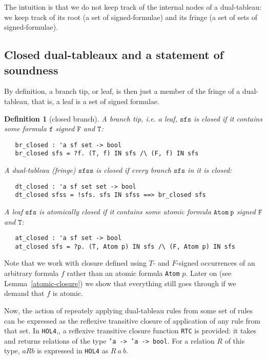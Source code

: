 \documentclass[a4paper]{article}
\newtheorem{definition}{Definition}
\newcommand{\hol}{\texttt{HOL4}}
\newcommand{\ie}{\textit{i.e. }}
\begin{document}
The intuition is that we do not keep track of the internal nodes of a
dual-tableau: we keep track of its root (a set of signed-formulae) and
its fringe (a set of sets of signed-formulae).

\subsection{Closed dual-tableaux and a statement of soundness}

By definition, a branch tip, or leaf, is then just a member of the fringe of a
dual-tableau, that is, a leaf is a set of signed formulae. 

\begin{definition}[closed branch]
\label{br-closed}\label{dt-closed}\label{at-closed}
  A branch tip, \ie a leaf, $\mathtt{sfs}$ is closed if it contains some
  formula $\mathtt{f}$ signed
  $\mathtt{F}$ and $\mathtt{T}$:
\begin{verbatim}
   br_closed : 'a sf set -> bool
   br_closed sfs = ?f. (T, f) IN sfs /\ (F, f) IN sfs 
\end{verbatim}

  A dual-tableau (fringe) $\mathtt{sfss}$ is closed if every 
  branch $\mathtt{sfs}$ in it is closed: 
\begin{verbatim}
   dt_closed : 'a sf set set -> bool
   dt_closed sfss = !sfs. sfs IN sfss ==> br_closed sfs 
\end{verbatim}

  A leaf $\mathtt{sfs}$ is atomically closed if it contains some atomic
  formula $\mathtt{Atom\ p}$ signed
  $\mathtt{F}$ and $\mathtt{T}$:
\begin{verbatim}
   at_closed : 'a sf set -> bool
   at_closed sfs = ?p. (T, Atom p) IN sfs /\ (F, Atom p) IN sfs
\end{verbatim}

\end{definition}

Note that we work with closure defined using $T$- and $F$-signed occurrences of
an arbitrary formula $f$ rather than an atomic formula \texttt{Atom} $p$.
Later on (see Lemma~\ref{atomic-closure}) we show
that everything still goes through if we demand that $f$ is atomic.

Now, the action of repeately applying dual-tableau rules from some set of
rules can be expressed as the reflexive transitive closure of
application of any rule from that set.
In \hol,, a reflexive transitive closure function \texttt{RTC} is provided:
it takes and returns relations of the type \texttt{'a -> 'a -> bool}.
For a relation $R$ of this type, $aRb$ is expressed in \hol{} as $R\ a\ b$.
%
\end{document}
